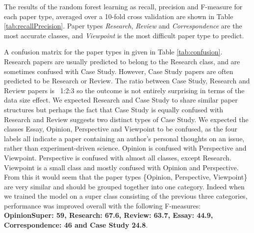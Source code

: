 \documentclass{svmult}
\begin{document}
The results of the random forest learning as recall, precision and F-measure
for each paper type, averaged over a 10-fold cross validation are shown in Table
\ref{tab:recallPrecision}. Paper types {\em Research}, {\em Review} and {\em
Correspondence} are the most accurate classes, and {\em Viewpoint} is the most
difficult paper type to predict. 


A confusion matrix for the paper types in given in Table
\ref{tab:confusion}. Research papers are usually predicted to belong
to the Research class, and are sometimes confused with Case
Study. However, Case Study papers are often predicted to be Research
or Review. The ratio between Case Study, Research and Review papers is
~1:2:3 so the outcome is not entirely surprising in terms of the data
size effect. We expected Research and Case Study to share similar
paper structures but perhaps the fact that Case Study is equally
confused with Research and Review suggests two distinct types of Case
Study.  We expected the classes Essay, Opinion, Perspective and
Viewpoint to be confused, as the four labels all indicate a paper
containing an author's personal thoughts on an issue, rather than
experiment-driven science. Opinion is confused with Perspective and
Viewpoint. Perspective is confused with almost all classes, except
Research. Viewpoint is a small class and mostly confused with Opinion
and Perspective. From this it would seem that the paper types
\{Opinion, Perspective, Viewpoint\} are very similar and should be
grouped together into one category. Indeed when we trained the model
on a super class consisting of the previous three categories,
performance was improved overall with the following F-measures:
{\bf OpinionSuper: 59, Research: 67.6, Review: 63.7, Essay: 44.9,
Correspondence: 46 and Case Study 24.8}.
\end{document}
